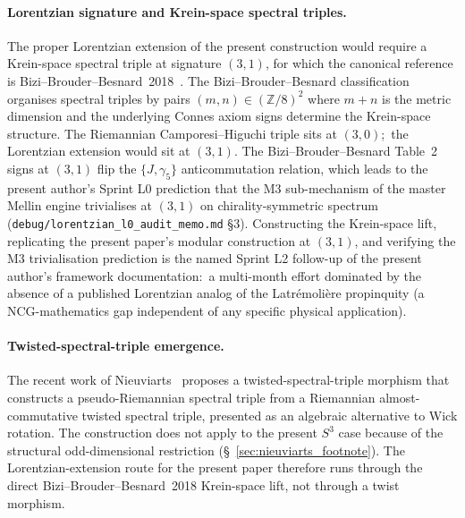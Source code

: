 \documentclass[11pt,a4paper]{article}
\theoremstyle{plain}
\theoremstyle{definition}
\newcommand{\sthree}{S^{3}}
\newcommand{\Z}{\mathbb{Z}}
\begin{document}
\paragraph{Lorentzian signature and Krein-space spectral triples.}
The proper Lorentzian extension of the present construction would
require a Krein-space spectral triple at signature $(3, 1)$, for which
the canonical reference is
Bizi--Brouder--Besnard~2018~\cite{bizi_brouder_besnard2018}. The
Bizi--Brouder--Besnard classification organises spectral triples by
pairs $(m, n) \in (\Z/8)^2$ where $m + n$ is the metric dimension and
the underlying Connes axiom signs determine the Krein-space structure.
The Riemannian Camporesi--Higuchi triple sits at $(3, 0)$;\ the
Lorentzian extension would sit at $(3, 1)$. The
Bizi--Brouder--Besnard Table~2 signs at $(3, 1)$ flip the
$\{J, \gamma_5\}$ anticommutation relation, which leads to the
present author's Sprint L0 prediction that the M3 sub-mechanism of
the master Mellin engine trivialises at $(3, 1)$ on chirality-symmetric
spectrum (\texttt{debug/lorentzian\_l0\_audit\_memo.md} \S 3).
Constructing the Krein-space lift, replicating the present paper's
modular construction at $(3, 1)$, and verifying the M3 trivialisation
prediction is the named Sprint L2 follow-up of the present author's
framework documentation:\ a multi-month effort dominated by the
absence of a published Lorentzian analog of the Latr\'emoli\`ere
propinquity (a NCG-mathematics gap independent of any specific physical
application).

\paragraph{Twisted-spectral-triple emergence.}
The recent work of
Nieuviarts~\cite{nieuviarts2025a, nieuviarts2024, nieuviarts2025b_proceedings}
proposes a twisted-spectral-triple morphism that constructs a
pseudo-Riemannian spectral triple from a Riemannian almost-commutative
twisted spectral triple, presented as an algebraic alternative to
Wick rotation. The construction does not apply to the present
$\sthree$ case because of the structural odd-dimensional restriction
(\S~\ref{sec:nieuviarts_footnote}). The Lorentzian-extension route for
the present paper therefore runs through the direct
Bizi--Brouder--Besnard~2018 Krein-space lift, not through a twist
morphism.
\end{document}
